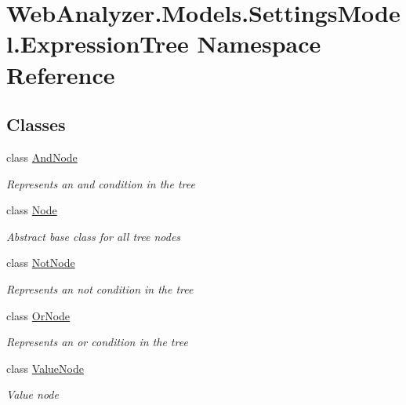 \hypertarget{namespace_web_analyzer_1_1_models_1_1_settings_model_1_1_expression_tree}{}\section{Web\+Analyzer.\+Models.\+Settings\+Model.\+Expression\+Tree Namespace Reference}
\label{namespace_web_analyzer_1_1_models_1_1_settings_model_1_1_expression_tree}
\subsection*{Classes}
\begin{DoxyCompactItemize}
\item 
class \hyperlink{class_web_analyzer_1_1_models_1_1_settings_model_1_1_expression_tree_1_1_and_node}{And\+Node}
\begin{DoxyCompactList}\small\item\em Represents an and condition in the tree \end{DoxyCompactList}\item 
class \hyperlink{class_web_analyzer_1_1_models_1_1_settings_model_1_1_expression_tree_1_1_node}{Node}
\begin{DoxyCompactList}\small\item\em Abstract base class for all tree nodes \end{DoxyCompactList}\item 
class \hyperlink{class_web_analyzer_1_1_models_1_1_settings_model_1_1_expression_tree_1_1_not_node}{Not\+Node}
\begin{DoxyCompactList}\small\item\em Represents an not condition in the tree \end{DoxyCompactList}\item 
class \hyperlink{class_web_analyzer_1_1_models_1_1_settings_model_1_1_expression_tree_1_1_or_node}{Or\+Node}
\begin{DoxyCompactList}\small\item\em Represents an or condition in the tree \end{DoxyCompactList}\item 
class \hyperlink{class_web_analyzer_1_1_models_1_1_settings_model_1_1_expression_tree_1_1_value_node}{Value\+Node}
\begin{DoxyCompactList}\small\item\em Value node \end{DoxyCompactList}\end{DoxyCompactItemize}
